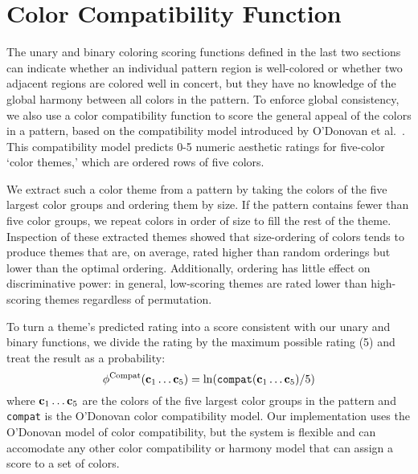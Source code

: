\section{Color Compatibility Function}
\label{sec:colorCompat}

The unary and binary coloring scoring functions defined in the last two sections can indicate whether an individual pattern region is well-colored or whether two adjacent regions are colored well in concert, but they have no knowledge of the global harmony between all colors in the pattern. To enforce global consistency, we also use a color compatibility function to score the general appeal of the colors in a pattern, based on the compatibility model introduced by O'Donovan et al.~. This compatibility model predicts 0-5 numeric aesthetic ratings for five-color `color themes,' which are ordered rows of five colors. 

We extract such a color theme from a pattern by taking the colors of the five largest color groups and ordering them by size. If the pattern contains fewer than five color groups, we repeat colors in order of size to fill the rest of the theme. Inspection of these extracted themes showed that size-ordering of colors tends to produce themes that are, on average, rated higher than random orderings but lower than the optimal ordering. Additionally, ordering has little effect on discriminative power: in general, low-scoring themes are rated lower than high-scoring themes regardless of permutation.

To turn a theme's predicted rating into a score consistent with our unary and binary functions, we divide the rating by the maximum possible rating (5) and treat the result as a probability:
\begin{equation*}
\phi^{\textrm{Compat}}(\mathbf{c}_1 \ldots \mathbf{c}_5) = \ln(\texttt{compat}(\mathbf{c}_1 \ldots \mathbf{c}_5) / 5)
\end{equation*}
where $\mathbf{c}_1 \ldots \mathbf{c}_5$ are the colors of the five largest color groups in the pattern and \texttt{compat} is the O'Donovan color compatibility model. Our implementation uses the O'Donovan model of color compatibility, but the system is flexible and can accomodate any other color compatibility or harmony model that can assign a score to a set of colors.

